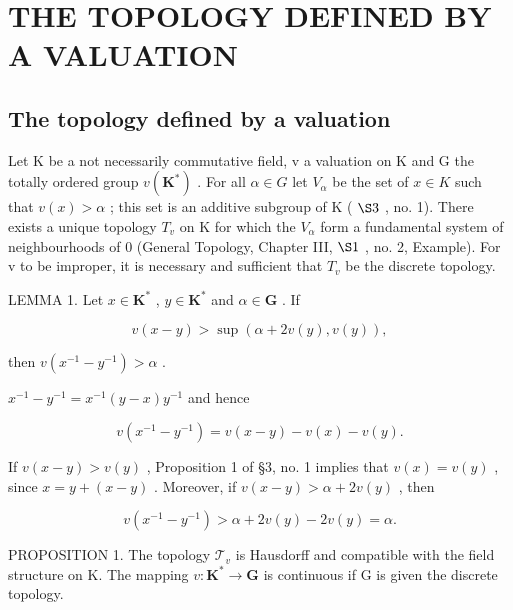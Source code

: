 \section{THE TOPOLOGY DEFINED BY A VALUATION}

\subsection{The topology defined by a valuation}

Let K be a not necessarily commutative field, v a valuation on K and G the totally ordered group \(v(\mathbf{K}^{*})\) . For all \(\alpha \in G\) let \(V_{\alpha}\) be the set of \(x \in K\) such that \(v(x) > \alpha\) ; this set is an additive subgroup of K ( \(\S 3\) , no. 1). There exists a unique topology \(T_{v}\) on K for which the \(V_{\alpha}\) form a fundamental system of neighbourhoods of 0 (General Topology, Chapter III, \(\S 1\) , no. 2, Example). For v to be improper, it is necessary and sufficient that \(T_{v}\) be the discrete topology.

LEMMA 1. Let \(x \in \mathbf{K}^*\) , \(y \in \mathbf{K}^*\) and \(\alpha \in \mathbf{G}\) . If

\[
v (x - y) > \sup (\alpha + 2 v (y), v (y)),
\]

then \(v(x^{-1} - y^{-1}) > \alpha\) .

\(x^{-1} - y^{-1} = x^{-1}(y - x)y^{-1}\) and hence

\[
v (x ^ {- 1} - y ^ {- 1}) = v (x - y) - v (x) - v (y).
\]

If \(v(x - y) > v(y)\) , Proposition 1 of §3, no. 1 implies that \(v(x) = v(y)\) , since \(x = y + (x - y)\) . Moreover, if \(v(x - y) > \alpha + 2v(y)\) , then

\[
v (x ^ {- 1} - y ^ {- 1}) > \alpha + 2 v (y) - 2 v (y) = \alpha .
\]

PROPOSITION 1. The topology \(\mathcal{T}_{v}\) is Hausdorff and compatible with the field structure on K. The mapping \(v: \mathbf{K}^{*} \to \mathbf{G}\) is continuous if G is given the discrete topology.

